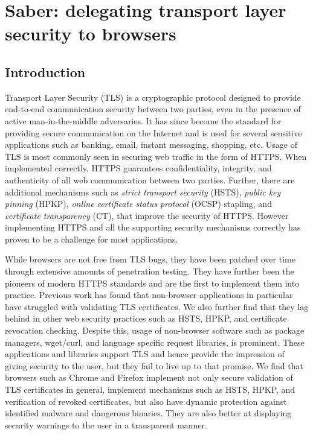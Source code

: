 \chapter{Saber: delegating transport layer security to browsers}
\label{ch:saber}

\section{Introduction}
\label{sec:intro-saber}

Transport Layer Security (TLS) is a cryptographic protocol designed to provide
end-to-end communication security between two parties, even in the presence of
active man-in-the-middle adversaries\cite{RFC5246}. It has since become the
standard for providing secure communication on the Internet and is used for
several sensitive applications such as banking, email, instant messaging,
shopping, etc. Usage of TLS is most commonly seen in securing web traffic in
the form of HTTPS\cite{RFC2818}. When implemented correctly, HTTPS guarantees
confidentiality, integrity, and authenticity of all web communication between
two parties. Further, there are additional mechanisms such as \emph{strict
transport security} (HSTS)\cite{RFC6797}, \emph{public key pinning}
(HPKP)\cite{RFC7469}, \emph{online certificate status protocol} (OCSP)
stapling, and \emph{certificate transparency} (CT)\cite{RFC6962}, that improve
the security of HTTPS. However implementing HTTPS and all the supporting
security mechanisms correctly has proven to be a challenge for most
applications.

While browsers are not free from TLS bugs, they have been patched over time
through extensive amounts of penetration testing. They have further been the
pioneers of modern HTTPS standards and are the first to implement them into
practice. Previous work has found that non-browser applications in particular
have struggled with validating TLS certificates\cite{dangerous}. We also
further find that they lag behind in other web security practices such as HSTS,
HPKP, and certificate revocation checking. Despite this, usage of non-browser
software such as package managers, wget/curl, and language specific request
libraries, is prominent. These applications and libraries support TLS and hence
provide the impression of giving security to the user, but they fail to live up
to that promise. We find that browsers such as Chrome and Firefox implement not
only secure validation of TLS certificates in general, implement mechanisms
such as HSTS, HPKP, and verification of revoked certificates, but also have
dynamic protection against identified malware and dangerous
binaries\cite{safe-browsing}. They are also better at displaying security
warnings to the user in a transparent manner.

